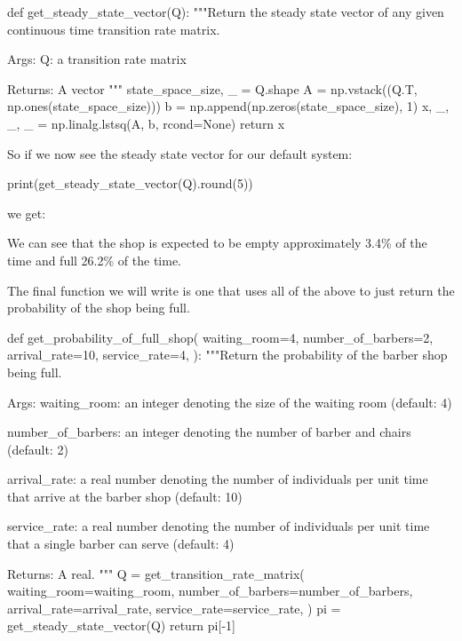\begin{pyin}
def get_steady_state_vector(Q):
    """Return the steady state vector of any given continuous
    time transition rate matrix.

    Args:
       Q: a transition rate matrix

    Returns:
        A vector
    """
    state_space_size, _ = Q.shape
    A = np.vstack((Q.T, np.ones(state_space_size)))
    b = np.append(np.zeros(state_space_size), 1)
    x, _, _, _ = np.linalg.lstsq(A, b, rcond=None)
    return x
\end{pyin}

So if we now see the steady state vector for our default system:

\begin{pyin}
print(get_steady_state_vector(Q).round(5))
\end{pyin}

we get:

\begin{pyout}
[0.03431 0.08577 0.10722 0.13402 0.16752 0.2094  0.26176]
\end{pyout}

We can see that the shop is expected to be empty approximately 3.4\% of the time
and full 26.2\% of the time.

The final function we will write is one that uses all of
the above to just return the probability of the shop being full.

\begin{pyin}
def get_probability_of_full_shop(
    waiting_room=4,
    number_of_barbers=2,
    arrival_rate=10,
    service_rate=4,
):
    """Return the probability of the barber shop being full.

    Args:
        waiting_room: an integer denoting the size of
                      the waiting room (default: 4)

        number_of_barbers: an integer denoting the number
                           of barber and chairs
                           (default: 2)

        arrival_rate: a real number denoting the number of
                      individuals per unit time that arrive
                      at the barber shop (default: 10)

        service_rate: a real number denoting the number of
                      individuals per unit time that a single
                      barber can serve (default: 4)

    Returns:
        A real.
    """
    Q = get_transition_rate_matrix(
        waiting_room=waiting_room,
        number_of_barbers=number_of_barbers,
        arrival_rate=arrival_rate,
        service_rate=service_rate,
    )
    pi = get_steady_state_vector(Q)
    return pi[-1]
\end{pyin}

